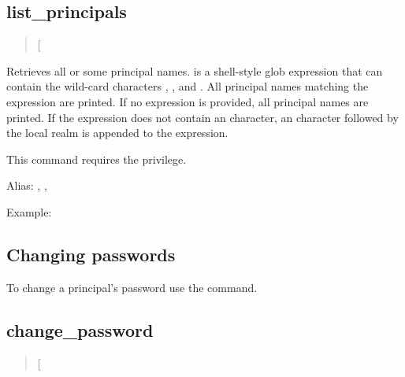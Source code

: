 \documentclass[letterpaper,10pt,english]{sphinxmanual}
\begin{document}
\subsection{list\_principals}
\label{\detokenize{admin/database:list-principals}}\begin{quote}

 {[}\sphinxstyleemphasis{expression}{]}
\end{quote}

Retrieves all or some principal names.   is a shell-style
glob expression that can contain the wild-card characters ,
\sphinxcode{*}, and \sphinxcode{{[}{]}}.  All principal names matching the expression are
printed.  If no expression is provided, all principal names are
printed.  If the expression does not contain an  character, an
 character followed by the local realm is appended to the
expression.

This command requires the  privilege.

Alias: , , 

Example:

%
\begin{sphinxVerbatim}[commandchars=\\\{\}]
   
\end{sphinxVerbatim}


\subsection{Changing passwords}
\label{\detokenize{admin/database:changing-passwords}}
To change a principal’s password use the {\hyperref[\detokenize{admin/admin_commands/kadmin_local:kadmin-1}]{}}
 command.


\subsection{change\_password}
\label{\detokenize{admin/database:change-password}}\begin{quote}

 {[}\sphinxstyleemphasis{options}{]} 
\end{quote}
\end{document}
